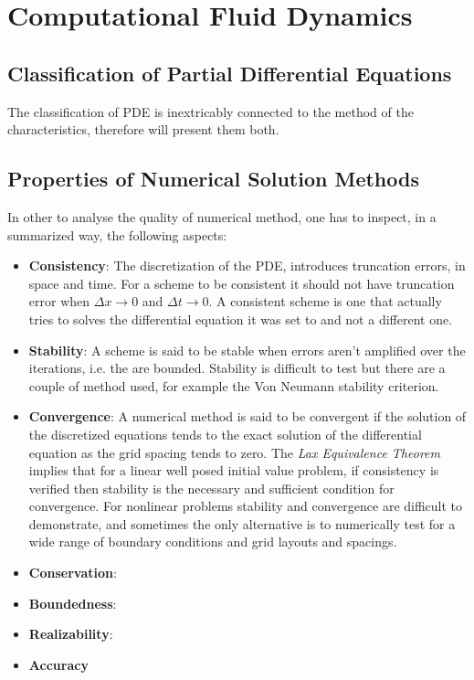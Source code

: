\chapter{Computational Fluid Dynamics}
\section{Classification of Partial Differential Equations}

 The classification of PDE is inextricably connected to the method of the characteristics, therefore will present them both.

 \section{Properties of Numerical Solution Methods}
 In other to analyse the quality of numerical method, one has to inspect, in a summarized way, the following aspects:

 \begin{itemize}
 \item \textbf{Consistency}: The discretization of the PDE, introduces truncation errors, in space and time. For a scheme to be consistent it should not have truncation error when $\Delta x  \rightarrow 0$  and $\Delta t \rightarrow 0$. A consistent scheme is one that actually tries to solves the differential equation it was set to and not a different one.

 \item \textbf{Stability}: A scheme is said to be stable when errors aren't amplified over the iterations, i.e. the are bounded. Stability is difficult to test but there are a couple of method used, for example the Von Neumann stability criterion.

 \item \textbf{Convergence}: A numerical method is said to be convergent if the solution of the discretized equations tends to the exact solution of the differential equation as the grid spacing tends to zero. The \emph{Lax Equivalence Theorem} implies that for a linear well posed initial value problem, if consistency is verified then stability is the necessary and sufficient condition for convergence. 
 For nonlinear problems stability and convergence are difficult to demonstrate, and sometimes the only alternative is to numerically test for a wide range of boundary conditions and grid layouts and spacings. 

 \item \textbf{Conservation}:

 \item \textbf{Boundedness}:

 \item \textbf{Realizability}:

 \item \textbf{Accuracy}

 \end{itemize}


